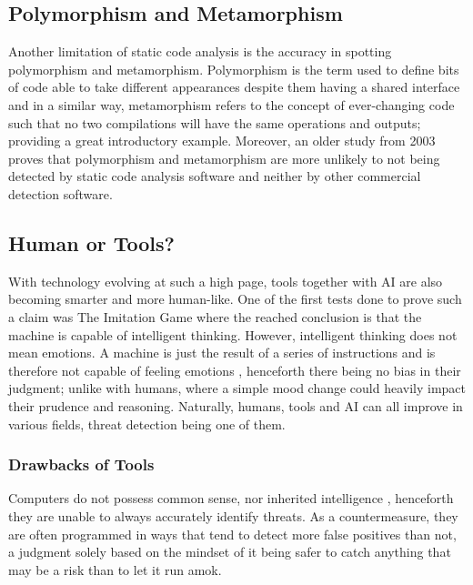 \subsection{Polymorphism and Metamorphism}
Another limitation of static code analysis is the accuracy in spotting polymorphism and metamorphism. Polymorphism is the term used to define bits of code able to take different appearances despite them having a shared interface and in a similar way, metamorphism refers to the concept of ever-changing code such that no two compilations will have the same operations and outputs; \cite{metamorphismInC} providing a great introductory example. Moreover, an older study from 2003 proves that polymorphism and metamorphism are more unlikely to not being detected by static code analysis software and neither by other commercial detection software.




\subsection{Human or Tools?}

With technology evolving at such a high page, tools together with AI are also becoming smarter and more human-like. One of the first tests done to prove such a claim was The Imitation Game \cite{french2000turing} where the reached conclusion is that the machine is capable of intelligent thinking. However, intelligent thinking does not mean emotions. A machine is just the result of a series of instructions and is therefore not capable of feeling emotions \cite{picard2008toward}, henceforth there being no bias in their judgment; unlike with humans, where a simple mood change could heavily impact their prudence and reasoning. Naturally, humans, tools and AI can all improve in various fields, threat detection being one of them.

\subsubsection{Drawbacks of Tools}

Computers do not possess common sense, nor inherited intelligence \cite{loch1996evaluating}, henceforth they are unable to always accurately identify threats. As a countermeasure, they are often programmed in ways that tend to detect more false positives than not, a judgment solely based on the mindset of it being safer to catch anything that may be a risk than to let it run amok.

